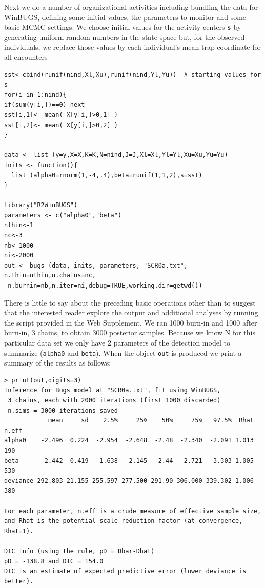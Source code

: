 Next we do a number of organizational activities including bundling the data for WinBUGS, defining some initial values, the parameters to monitor and some basic MCMC settings. 
We choose initial values for the activity centers ${\bf s}$ by generating uniform random numbers in the state-space but, for the observed individuals, we replace those values by each individual's mean trap coordinate for all encounters
\begin{verbatim}
sst<-cbind(runif(nind,Xl,Xu),runif(nind,Yl,Yu))  # starting values for s
for(i in 1:nind){
if(sum(y[i,])==0) next
sst[i,1]<- mean( X[y[i,]>0,1] )
sst[i,2]<- mean( X[y[i,]>0,2] )
}

data <- list (y=y,X=X,K=K,N=nind,J=J,Xl=Xl,Yl=Yl,Xu=Xu,Yu=Yu)
inits <- function(){
  list (alpha0=rnorm(1,-4,.4),beta=runif(1,1,2),s=sst)
}

library("R2WinBUGS")
parameters <- c("alpha0","beta")
nthin<-1
nc<-3
nb<-1000
ni<-2000
out <- bugs (data, inits, parameters, "SCR0a.txt", n.thin=nthin,n.chains=nc,
 n.burnin=nb,n.iter=ni,debug=TRUE,working.dir=getwd())
\end{verbatim}
There is little to say about the preceding basic operations other than to suggest that the interested reader explore the output and additional analyses by running the script provided in the Web Supplement. 
We ran 1000 burn-in and 1000 after burn-in, 3 chains, to obtain 3000 posterior samples.  Because we know N for this particular data set we only have 2 parameters of the detection model to summarize (\mbox{\tt alpha0} and \mbox{\tt beta}).  When the object \mbox{\tt out} is produced we print a summary of the results as follows:

\begin{verbatim}
> print(out,digits=3)
Inference for Bugs model at "SCR0a.txt", fit using WinBUGS,
 3 chains, each with 2000 iterations (first 1000 discarded)
 n.sims = 3000 iterations saved
            mean     sd    2.5%     25%    50%     75%   97.5%  Rhat n.eff
alpha0    -2.496  0.224  -2.954  -2.648  -2.48  -2.340  -2.091 1.013   190
beta       2.442  0.419   1.638   2.145   2.44   2.721   3.303 1.005   530
deviance 292.803 21.155 255.597 277.500 291.90 306.000 339.302 1.006   380

For each parameter, n.eff is a crude measure of effective sample size,
and Rhat is the potential scale reduction factor (at convergence, Rhat=1).

DIC info (using the rule, pD = Dbar-Dhat)
pD = -138.8 and DIC = 154.0
DIC is an estimate of expected predictive error (lower deviance is better).
\end{verbatim}

